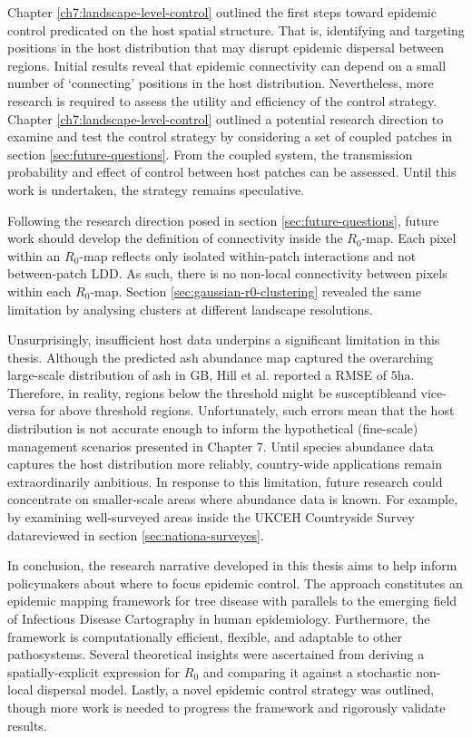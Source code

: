 Chapter \ref{ch7:landscape-level-control} outlined the first steps toward epidemic control predicated on the host spatial structure.
That is, identifying and targeting positions in the host distribution that may disrupt epidemic dispersal between regions.
Initial results reveal that epidemic connectivity can depend on a small number of `connecting' positions in the host distribution.
Nevertheless, more research is required to assess the utility and efficiency of the control strategy. Chapter \ref{ch7:landscape-level-control}
outlined a potential research direction to examine and test the control strategy by considering a set of coupled patches in section \ref{sec:future-questions}.
From the coupled system,  the transmission probability and effect of control between host patches can be assessed.
Until this work is undertaken, the strategy remains speculative.

Following the research direction posed in section \ref{sec:future-questions}, future work should develop the definition of connectivity inside the $R_0$-map. Each pixel within an $R_0$-map reflects only isolated within-patch interactions and not between-patch LDD.
As such, there is no non-local connectivity between pixels within each $R_0$-map. Section \ref{sec:gaussian-r0-clustering} revealed the same limitation by analysing clusters at different landscape resolutions.

Unsurprisingly, insufficient host data underpins a significant limitation in this thesis.
Although the predicted ash abundance map captured the overarching large-scale distribution of ash in GB, Hill et al. reported a RMSE of $5\mathrm{ha}$. Therefore, in reality, regions below the threshold might be susceptible\textemdash and vice-versa for above threshold regions.
Unfortunately, such errors mean that the host distribution is not accurate enough to inform the hypothetical (fine-scale) management scenarios presented in Chapter 7. Until species abundance data captures the host distribution more reliably, country-wide applications remain extraordinarily ambitious. In response to this limitation, future research could concentrate on smaller-scale areas where abundance data is known. For example, by examining well-surveyed areas inside the UKCEH Countryside Survey data\textemdash reviewed in section \ref{sec:nationa-surveyes}.

In conclusion, the research narrative developed in this thesis aims to help inform policymakers about where to focus epidemic control.
The approach constitutes an epidemic mapping framework for tree disease with parallels to the emerging field of Infectious Disease Cartography in human epidemiology. Furthermore, the framework is computationally efficient, flexible, and adaptable to other pathosystems.
Several theoretical insights were ascertained from deriving a spatially-explicit expression for $R_0$ and comparing it against a stochastic non-local dispersal model. Lastly, a novel epidemic control strategy was outlined, though more work is needed to progress the framework and rigorously validate results.


